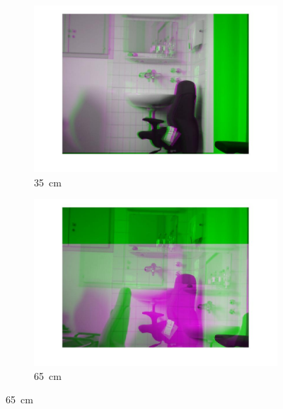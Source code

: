 \begin{figure}[h]
\begin{subfigure}{0.48\linewidth}
    \includegraphics[width=\linewidth]{images/A1_35cm.jpg}
    \vspace{-30pt}
    \caption{\SI{35}{\centi\meter}}
  \end{subfigure}
  \hfill
  \begin{subfigure}{0.48\linewidth}
    \centering
    \includegraphics[width=\linewidth]{images/A1_65cm.jpg}
    \vspace{-30pt}
    \caption{\SI{65}{\centi\meter}}
  \end{subfigure}
\end{figure}
\newpage
